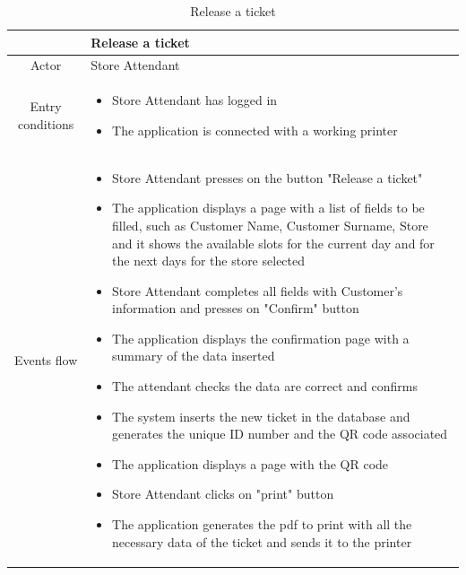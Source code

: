 \documentclass[table, 12pt]{article}
\begin{document}
\begin{longtable}{|c| p{10cm}|}
    \caption{Release a ticket}                                                                                                                                                      \\
    \hline
                     & Release a ticket                                                                                                                                             \\
    \hline
    Actor            & Store Attendant                                                                                                                                              \\
    \hline
    Entry conditions & \begin{itemize}
        \item Store Attendant has logged in
        \item The application is connected with a working printer
    \end{itemize}                                                                                                                                   \\
    \hline
    Events flow      & \begin{itemize}[nosep,after=\strut]
        \item Store Attendant presses on the button "Release a ticket"
        \item The application displays a page with a list of fields to be filled, such as Customer Name, Customer Surname, Store and it shows the available slots for the current day and for the next days for the store selected
        \item Store Attendant completes all fields with Customer's information and presses on "Confirm" button
        \item The application displays the confirmation page with a summary of the data inserted
        \item The attendant checks the data are correct and confirms
        \item The system inserts the new ticket in the database and generates the unique ID number and the QR code associated
        \item The application displays a page with the QR code
        \item Store Attendant clicks on "print" button
        \item The application generates the pdf to print with all the necessary data of the ticket and sends it to the printer

\end{itemize}
\end{longtable}
\end{document}
